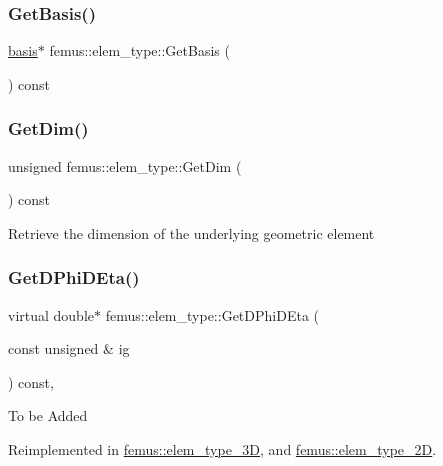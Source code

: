 \subsubsection{\texorpdfstring{Get\+Basis()}{GetBasis()}}
{\footnotesize\ttfamily \mbox{\hyperlink{classfemus_1_1basis}{basis}}$\ast$ femus\+::elem\+\_\+type\+::\+Get\+Basis (\begin{DoxyParamCaption}{ }\end{DoxyParamCaption}) const\hspace{0.3cm}{\ttfamily [inline]}}

\mbox{\label{classfemus_1_1elem__type_aa94378d258af64d24a9970d30f229589}} 
\subsubsection{\texorpdfstring{Get\+Dim()}{GetDim()}}
{\footnotesize\ttfamily unsigned femus\+::elem\+\_\+type\+::\+Get\+Dim (\begin{DoxyParamCaption}{ }\end{DoxyParamCaption}) const\hspace{0.3cm}{\ttfamily [inline]}}

Retrieve the dimension of the underlying geometric element \mbox{\label{classfemus_1_1elem__type_a510e44439de5cdd6ab5d04e3f8a5bdfe}} 
\subsubsection{\texorpdfstring{Get\+D\+Phi\+D\+Eta()}{GetDPhiDEta()}}
{\footnotesize\ttfamily virtual double$\ast$ femus\+::elem\+\_\+type\+::\+Get\+D\+Phi\+D\+Eta (\begin{DoxyParamCaption}\item[{const unsigned \&}]{ig }\end{DoxyParamCaption}) const\hspace{0.3cm}{\ttfamily [inline]}, {\ttfamily [virtual]}}

To be Added 

Reimplemented in \mbox{\hyperlink{classfemus_1_1elem__type__3_d_aa08787fdf3934c52c41a14a59884eb7b}{femus\+::elem\+\_\+type\+\_\+3D}}, and \mbox{\hyperlink{classfemus_1_1elem__type__2_d_a3a77bc47f11a128210ed5c22a1179cc4}{femus\+::elem\+\_\+type\+\_\+2D}}.


